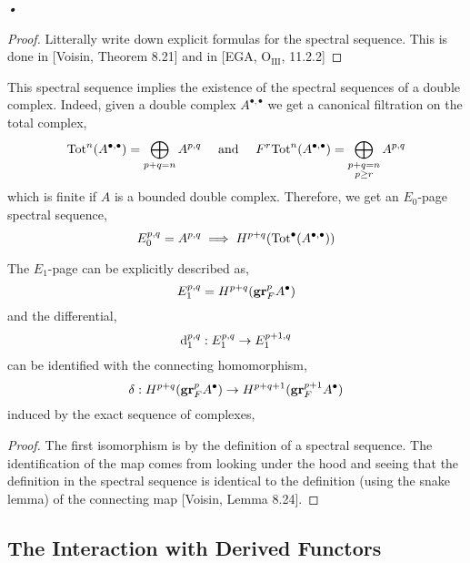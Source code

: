 \textit{•}\documentclass[12pt]{article}
\begin{document}
\begin{proof}
Litterally write down explicit formulas for the spectral sequence. This is done in [Voisin, Theorem 8.21] and in [EGA, $\mathrm{O_{III}}$, 11.2.2] 
\end{proof}

\begin{rmk}
This spectral sequence implies the existence of the spectral sequences of a double complex. Indeed, given a double complex $A^{\bullet, \bullet}$ we get a canonical filtration on the total complex,
\[ \mathrm{Tot}^n(A^{\bullet, \bullet}) = \bigoplus_{p+q = n} A^{p,q} \quad \text{ and } \quad F^r \mathrm{Tot}^n(A^{\bullet, \bullet}) = \bigoplus_{\substack{p + q = n \\ p \ge r}} A^{p,q} \]
which is finite if $A$ is a bounded double complex. Therefore, we get an $E_0$-page spectral sequence,
\[ E^{p,q}_0 = A^{p,q} \implies H^{p+q}(\mathrm{Tot}^\bullet(A^{\bullet, \bullet})) \]
\end{rmk}

\begin{lemma}
The $E_1$-page can be explicitly described as,
\[ E_1^{p,q} = H^{p+q}(\mathbf{gr}^p_F A^\bullet) \]
and the differential,
\[ \mathrm{d}_1^{p,q} : E_1^{p,q} \to E_1^{p+1,q} \]
can be identified with the connecting homomorphism,
\[ \delta : H^{p+q}(\mathbf{gr}^p_F A^\bullet) \to H^{p+q+1}(\mathbf{gr}_F^{p+1} A^\bullet) \]
induced by the exact sequence of complexes,
\begin{center}
\end{center}
\end{lemma}

\begin{proof}
The first isomorphism is by the definition of a spectral sequence. The identification of the map comes from looking under the hood and seeing that the definition in the spectral sequence is identical to the definition (using the snake lemma) of the connecting map [Voisin, Lemma 8.24].
\end{proof}

\subsection{The Interaction with Derived Functors}
\end{document}
